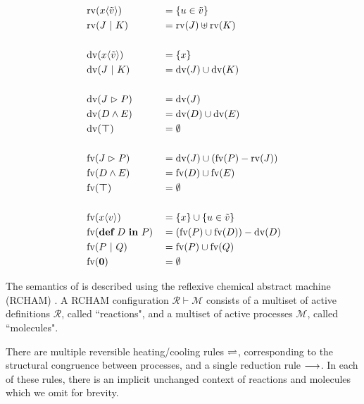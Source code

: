 \begin{alignat*}{2}
  & \operatorname{rv}(x\langle\tilde{v}\rangle) & &= \{ u \in \tilde{v} \} \\
  & \operatorname{rv}(J \ |\  K)           & &= \operatorname{rv}(J) \uplus \operatorname{rv}(K) \\
  \\
  & \operatorname{dv}(x\langle\tilde{v}\rangle) & &= \{ x \} \\
  & \operatorname{dv}(J \ |\  K)           & &= \operatorname{dv}(J) \cup \operatorname{dv}(K) \\
  \\
  & \operatorname{dv}(J \vartriangleright P)         & &= \operatorname{dv}(J) \\
  & \operatorname{dv}(D \wedge E)           & &= \operatorname{dv}(D) \cup \operatorname{dv}(E) \\
  & \operatorname{dv}(\boldsymbol{\top})           & &= \emptyset \\
  \\
  & \operatorname{fv}(J \vartriangleright P)         & &= \operatorname{dv}(J) \cup (\operatorname{fv}(P) - \operatorname{rv}(J)) \\
  & \operatorname{fv}(D \wedge E)           & &= \operatorname{fv}(D) \cup \operatorname{fv}(E) \\
  & \operatorname{fv}(\boldsymbol{\top})           & &= \emptyset \\
  \\
  & \operatorname{fv}(x\langle v\rangle)         & &= \{ x \} \cup \{ u \in \tilde{v} \} \\
  & \operatorname{fv}(\textbf{def} \ D \ \textbf{in} \ P)         & &= (\operatorname{fv}(P) \cup \operatorname{fv}(D)) - \operatorname{dv}(D) \\
  & \operatorname{fv}(P \ |\  Q)           & &= \operatorname{fv}(P) \cup \operatorname{fv}(Q) \\
  & \operatorname{fv}(\textbf{0})          & &= \emptyset \\
\end{alignat*}



The semantics of \joincalc is described using the reflexive chemical abstract
machine (RCHAM) \cite{fournet_reflexive_1996}.
A RCHAM configuration
$ \mathcal{R} \vdash \mathcal{M} $
consists of a multiset of active definitions $\mathcal{R}$,
called ``reactions",
and a multiset of active processes $\mathcal{M}$,
called ``molecules".

There are multiple reversible heating/cooling rules $\rightleftharpoons$,
corresponding to the structural congruence between processes,
and a single reduction rule $\longrightarrow$.
In each of these rules, there is an implicit unchanged context of reactions and
molecules which we omit for brevity.


